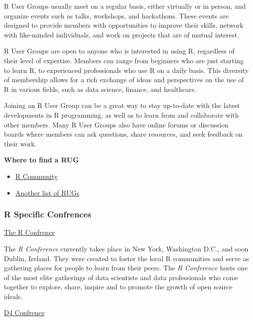 \documentclass[
]{book}
\begin{document}
R User Groups usually meet on a regular basis, either virtually or in person, and organize events such as talks, workshops, and hackathons. These events are designed to provide members with opportunities to improve their skills, network with like-minded individuals, and work on projects that are of mutual interest.

R User Groups are open to anyone who is interested in using R, regardless of their level of expertise. Members can range from beginners who are just starting to learn R, to experienced professionals who use R on a daily basis. This diversity of membership allows for a rich exchange of ideas and perspectives on the use of R in various fields, such as data science, finance, and healthcare.

Joining an R User Group can be a great way to stay up-to-date with the latest developments in R programming, as well as to learn from and collaborate with other members. Many R User Groups also have online forums or discussion boards where members can ask questions, share resources, and seek feedback on their work.

\textbf{Where to find a RUG}

\begin{itemize}
\item
  \href{https://r-community.org/usergroups/}{R Community}
\item
  \href{https://jumpingrivers.github.io/meetingsR/r-user-groups.html}{Another list of RUGs}\\
\end{itemize}

\hypertarget{r-specific-confrences}{%
\subsubsection*{R Specific Confrences}\label{r-specific-confrences}}

\href{https://rstats.ai/gov}{The R Confrence}

The \emph{R Conference} currently takes place in New York, Washington D.C., and soon Dublin, Ireland. They were created to foster the local R communities and serve as gathering places for people to learn from their peers. The \emph{R Conference} hosts one of the most elite gatherings of data scientists and data professionals who come together to explore, share, inspire and to promote the growth of open source ideals.

\href{https://d4con.io/}{D4 Confrence}
\end{document}
